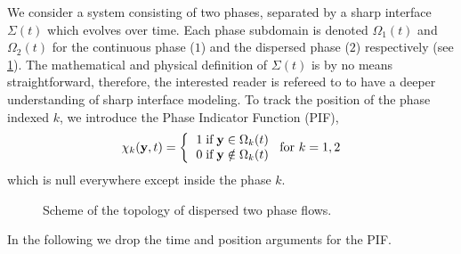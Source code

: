 We consider a system consisting of two phases, separated by a sharp interface $\Sigma(t)$ which evolves over time. 
Each phase subdomain is denoted $\Omega_1(t)$ and $\Omega_2(t)$ for the continuous phase ($1$) and the dispersed phase ($2$) respectively (see \ref{fig:Scheme}). 
The mathematical and physical definition of $\Sigma(t)$ is by no means straightforward, therefore, the interested reader is refereed to \cite{bothe2022sharp} to have a deeper understanding of sharp interface modeling. 
To track the position of the phase indexed $k$, we introduce the Phase Indicator Function (PIF), 
\begin{equation}
    \chi_k(\textbf{y},t) =  \left\{
      \begin{tabular}{cc}
        $1 \;\text{if} \;\textbf{y} \in \Omega_k(t)$\\
        $0 \;\text{if} \;\textbf{y} \notin \Omega_k(t)$
      \end{tabular}
      \right.
      \text{for $k = 1,2$}
      \label{eq:PIF}
\end{equation}
which is null everywhere except inside the phase $k$. 
\begin{figure}[h!]
    \centering
    \caption{Scheme of the topology of dispersed two phase flows.}
    \label{fig:Scheme}
\end{figure}
In the following we drop the time and position arguments for the PIF. 

